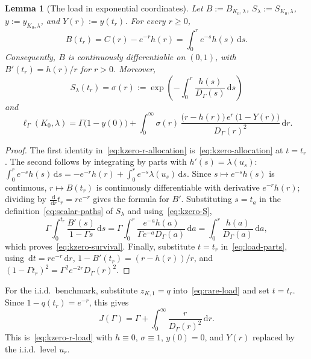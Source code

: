 \documentclass[11pt]{article}
\newtheorem{lemma}[theorem]{Lemma}
\theoremstyle{definition}
\theoremstyle{remark}
\newcommand{\dd}{\,\mathrm d}
\begin{document}
\begin{lemma}[The load in exponential coordinates]\label{lem:kzero-coordinates}
Let $B:=B_{K_0,\lambda}$, $S_\lambda:=S_{K_0,\lambda}$, $y:=y_{K_0,\lambda}$, and $Y(r):=y(t_r)$.
For every $r\ge0$,
\begin{equation}\label{eq:kzero-r-allocation}
 B(t_r)=C(r)-e^{-r}h(r)=\int_0^re^{-s}h(s)\dd s.
\end{equation}
Consequently, $B$ is continuously differentiable on $(0,1)$, with $B'(t_r)=h(r)/r$ for $r>0$.
Moreover,
\begin{equation}\label{eq:kzero-survival}
 S_\lambda(t_r)=\sigma(r):=\exp\!\left(-\int_0^r\frac{h(s)}{D_\Gamma(s)}\dd s\right)
\end{equation}
and
\begin{equation}\label{eq:kzero-r-load}
 \ell_\Gamma(K_0,\lambda)
 =\Gamma\bigl(1-y(0)\bigr)
 +\int_0^\infty\sigma(r)\,\frac{\bigl(r-h(r)\bigr)\,e^r\,\bigl(1-Y(r)\bigr)}{D_\Gamma(r)^2}\dd r.
\end{equation}
\end{lemma}

\begin{proof}
The first identity in~\eqref{eq:kzero-r-allocation} is~\eqref{eq:kzero-allocation} at $t=t_r$.
The second follows by integrating by parts with $h'(s)=\lambda(u_s)$:
$\int_0^re^{-s}h(s)\dd s=-e^{-r}h(r)+\int_0^re^{-s}\lambda(u_s)\dd s$.
Since $s\mapsto e^{-s}h(s)$ is continuous, $r\mapsto B(t_r)$ is continuously differentiable with derivative $e^{-r}h(r)$; dividing by $\frac{\dd}{\dd r}t_r=re^{-r}$ gives the formula for $B'$.
Substituting $s=t_a$ in the definition~\eqref{eq:scalar-paths} of $S_\lambda$ and using~\eqref{eq:kzero-S},
\[
 \Gamma\int_0^{t_r}\frac{B'(s)}{1-\Gamma s}\dd s
 =\Gamma\int_0^r\frac{e^{-a}h(a)}{\Gamma e^{-a}D_\Gamma(a)}\dd a
 =\int_0^r\frac{h(a)}{D_\Gamma(a)}\dd a,
\]
which proves~\eqref{eq:kzero-survival}.
Finally, substitute $t=t_r$ in~\eqref{eq:load-parts}, using $\dd t=re^{-r}\dd r$, $1-B'(t_r)=(r-h(r))/r$, and $(1-\Gamma t_r)^2=\Gamma^2e^{-2r}D_\Gamma(r)^2$.
\end{proof}
For the i.i.d.\ benchmark, substitute $z_{K,1}=q$
into~\eqref{eq:rare-load} and set $t=t_r$.
Since $1-q(t_r)=e^{-r}$, this gives
\begin{equation}\label{eq:iid-load-r}
 J(\Gamma)=\Gamma+\int_0^\infty
                  \frac{r}{D_\Gamma(r)^2}\dd r.
\end{equation}
This is~\eqref{eq:kzero-r-load} with $h\equiv0$, $\sigma\equiv1$, $y(0)=0$, and $Y(r)$ replaced by the i.i.d.\ level $u_r$.
\end{document}
